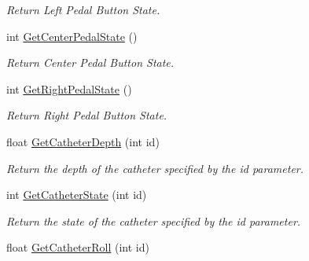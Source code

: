 \begin{DoxyCompactItemize}
\begin{DoxyCompactList}\small\item\em Return Left Pedal Button State. \item\end{DoxyCompactList}\item 
\hypertarget{classvtkVSP_a2478197c4643ef8f8909e98160cecd41}{
int \hyperlink{classvtkVSP_a2478197c4643ef8f8909e98160cecd41}{GetCenterPedalState} ()}
\label{classvtkVSP_a2478197c4643ef8f8909e98160cecd41}

\begin{DoxyCompactList}\small\item\em Return Center Pedal Button State. \item\end{DoxyCompactList}\item 
\hypertarget{classvtkVSP_a52dbc63b8c38792574b84410e30ff380}{
int \hyperlink{classvtkVSP_a52dbc63b8c38792574b84410e30ff380}{GetRightPedalState} ()}
\label{classvtkVSP_a52dbc63b8c38792574b84410e30ff380}

\begin{DoxyCompactList}\small\item\em Return Right Pedal Button State. \item\end{DoxyCompactList}\item 
\hypertarget{classvtkVSP_a3c1800e84f6cd86412e69a195335c249}{
float \hyperlink{classvtkVSP_a3c1800e84f6cd86412e69a195335c249}{GetCatheterDepth} (int id)}
\label{classvtkVSP_a3c1800e84f6cd86412e69a195335c249}

\begin{DoxyCompactList}\small\item\em Return the depth of the catheter specified by the id parameter. \item\end{DoxyCompactList}\item 
\hypertarget{classvtkVSP_ab6b0f6233332fda07b6a9ac81c2f743c}{
int \hyperlink{classvtkVSP_ab6b0f6233332fda07b6a9ac81c2f743c}{GetCatheterState} (int id)}
\label{classvtkVSP_ab6b0f6233332fda07b6a9ac81c2f743c}

\begin{DoxyCompactList}\small\item\em Return the state of the catheter specified by the id parameter. \item\end{DoxyCompactList}\item 
\hypertarget{classvtkVSP_af4dcfbcd86f249c6ef503ac3ddd8e726}{
float \hyperlink{classvtkVSP_af4dcfbcd86f249c6ef503ac3ddd8e726}{GetCatheterRoll} (int id)}
\label{classvtkVSP_af4dcfbcd86f249c6ef503ac3ddd8e726}


\end{DoxyCompactItemize}

